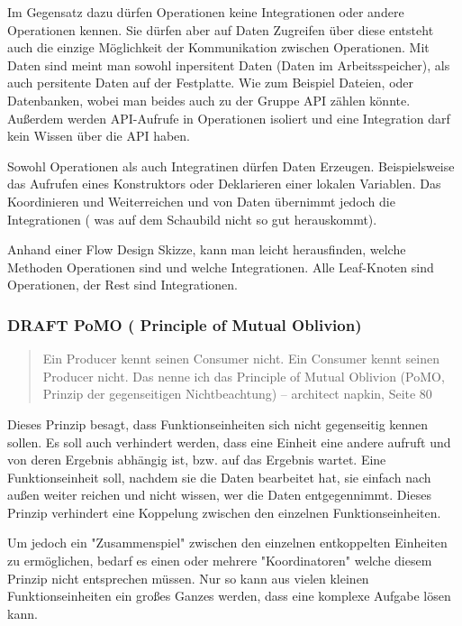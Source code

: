\documentclass[11pt]{article}
\begin{document}
Im Gegensatz dazu dürfen Operationen keine Integrationen oder andere Operationen kennen. 
Sie dürfen aber auf Daten Zugreifen über diese entsteht auch die einzige Möglichkeit der Kommunikation zwischen Operationen.
Mit Daten sind meint man sowohl inpersitent Daten (Daten im Arbeitsspeicher), als auch persitente Daten auf der Festplatte.
Wie zum Beispiel Dateien, oder Datenbanken, wobei man beides auch zu der Gruppe API zählen könnte. 
Außerdem werden API-Aufrufe in Operationen isoliert und eine Integration darf kein Wissen über die API haben.

Sowohl Operationen als auch Integratinen dürfen Daten Erzeugen.
Beispielsweise das Aufrufen eines Konstruktors oder Deklarieren einer lokalen Variablen.
Das Koordinieren und Weiterreichen und von Daten übernimmt jedoch die Integrationen ( was auf dem Schaubild nicht so
gut herauskommt).

Anhand einer Flow Design Skizze, kann man leicht herausfinden, welche Methoden Operationen sind und welche
Integrationen.
Alle Leaf-Knoten sind Operationen, der Rest sind Integrationen.



\subsubsection{{\bfseries\sffamily DRAFT} PoMO ( Principle of Mutual Oblivion)}
\label{sec:orgheadline29}
\begin{quote}
Ein Producer kennt seinen Consumer nicht. Ein Consumer kennt seinen Producer
nicht. Das nenne ich das Principle of Mutual Oblivion (PoMO,
Prinzip der gegenseitigen Nichtbeachtung) -- architect napkin, Seite 80
\end{quote}

Dieses Prinzip besagt, dass Funktionseinheiten sich nicht gegenseitig kennen sollen.
Es soll auch verhindert werden, dass eine Einheit eine andere aufruft und von deren Ergebnis
abhängig ist, bzw. auf das Ergebnis wartet.
Eine Funktionseinheit soll, nachdem sie die Daten bearbeitet hat, sie einfach nach
außen weiter reichen und nicht wissen, wer die Daten entgegennimmt.
Dieses Prinzip verhindert eine Koppelung zwischen den einzelnen Funktionseinheiten.

Um jedoch ein "Zusammenspiel" zwischen den einzelnen entkoppelten Einheiten zu ermöglichen, bedarf es einen oder
mehrere "Koordinatoren" welche diesem Prinzip nicht entsprechen müssen.
Nur so kann aus vielen kleinen Funktionseinheiten ein großes Ganzes werden, dass eine komplexe Aufgabe lösen kann.
\end{document}
